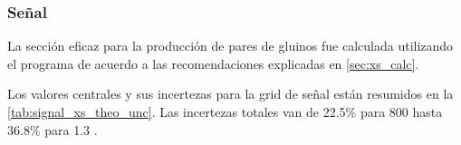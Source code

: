 \subsubsection{Señal}\label{sec:syst_signal}

La sección eficaz para la producción de pares de gluinos  fue calculada utilizando
el programa {\nllfast} de acuerdo a las recomendaciones explicadas en \cref{sec:xs_calc}.



Los valores centrales y sus incertezas para la grid de señal están resumidos en
la \cref{tab:signal_xs_theo_unc}. Las incertezas totales van de 22.5\% para 800
{\GeV} hasta 36.8\% para 1.3 \tev.

